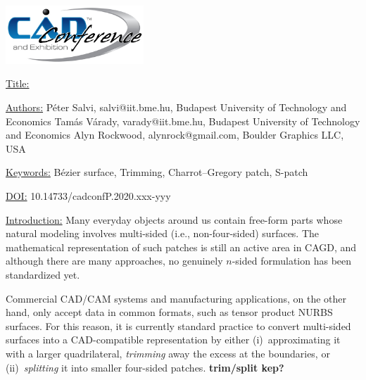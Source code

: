 \documentclass{article}
\begin{document}
{\centering  \includegraphics[width=5.173cm,height=2.193cm]{images/CADconverted-img001.jpg} \par}

\vspace{5pt}
\noindent
\underline{Title:}


\vspace{1em}
\noindent \underline{Authors:}
\newline
P\'eter Salvi, salvi@iit.bme.hu, Budapest University of Technology and Economics \newline
Tam\'as V\'arady, varady@iit.bme.hu, Budapest University of Technology and Economics \newline
Alyn Rockwood, alynrock@gmail.com, Boulder Graphics LLC, USA

\vspace{1em}
\noindent \underline{Keywords:}\newline
B\'ezier surface, Trimming, Charrot--Gregory patch, S-patch


\bigskip


\noindent \underline{DOI:} 10.14733/cadconfP.2020.xxx-yyy

\vspace{10pt}
\noindent\underline{Introduction:}\vspace{0.2em}\newline
Many everyday objects around us contain free-form parts whose natural modeling involves
multi-sided (i.e., non-four-sided) surfaces. The mathematical representation of such
patches is still an active area in CAGD, and although there are many approaches,
no genuinely $n$-sided formulation has been standardized yet.

Commercial CAD/CAM systems and manufacturing applications, on the other hand, only accept data
in common formats, such as tensor product NURBS surfaces. For this reason, it is currently
standard practice to convert multi-sided surfaces into  a CAD-compatible representation
by either (i)~approximating it with a larger quadrilateral, \emph{trimming} away the excess
at the boundaries, or (ii)~\emph{splitting} it into smaller four-sided patches.
{\bf trim/split kep?}
\end{document}
